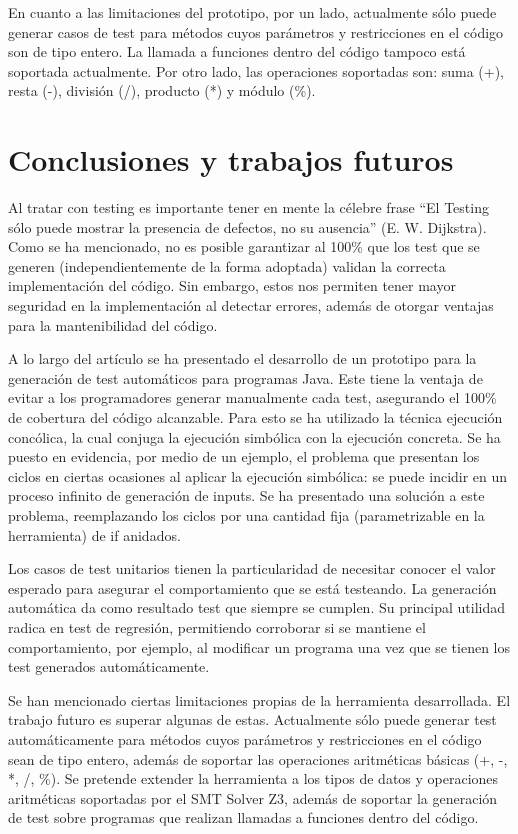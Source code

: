 \documentclass{llncs}
\begin{document}
En cuanto a las limitaciones del prototipo, por un lado, actualmente sólo puede generar casos de test para métodos cuyos parámetros y restricciones en el código son de tipo entero.
La llamada a funciones dentro del código tampoco está soportada actualmente. Por otro lado, las operaciones soportadas son: suma (+), resta (-),
división (/), producto (*) y módulo (\%).

\section{Conclusiones y trabajos futuros}
Al tratar con testing es importante tener en mente la célebre frase “El Testing sólo puede mostrar la presencia de defectos, no su ausencia” (E. W. Dijkstra).
Como se ha mencionado, no es posible garantizar al 100\% que los test que se generen (independientemente de la forma adoptada) validan la correcta
implementación del código. Sin embargo, estos nos permiten tener mayor seguridad en la implementación al detectar errores, además de otorgar ventajas
para la mantenibilidad del código.

A lo largo del artículo se ha presentado el desarrollo de un prototipo para la generación de test automáticos para programas Java. Este tiene la ventaja
de evitar a los programadores generar manualmente cada test, asegurando el 100\% de cobertura del código alcanzable. Para esto se ha utilizado la
técnica ejecución concólica, la cual conjuga la ejecución simbólica con la ejecución concreta. Se ha puesto en evidencia, por medio de un ejemplo,
el problema que presentan los ciclos en ciertas ocasiones al aplicar la ejecución simbólica: se puede incidir en un proceso infinito de generación de inputs.
Se ha presentado una solución a este problema, reemplazando los ciclos por una cantidad fija (parametrizable en la herramienta) de if anidados.


Los casos de test unitarios tienen la particularidad de necesitar conocer el valor esperado para asegurar el comportamiento que se está testeando.
La generación automática da como resultado test que siempre se cumplen. Su principal utilidad radica en test de regresión, permitiendo corroborar
si se mantiene el comportamiento, por ejemplo, al modificar un programa una vez que se tienen los test generados automáticamente.

Se han mencionado ciertas limitaciones propias de la herramienta desarrollada. El trabajo futuro es superar algunas de estas. Actualmente sólo puede
generar test automáticamente para métodos cuyos parámetros y restricciones en el código sean de tipo entero, además de soportar las operaciones
aritméticas básicas (+, -, *, /, \%). Se pretende extender la herramienta a los tipos de datos y operaciones aritméticas soportadas por el SMT Solver Z3,
además de soportar la generación de test sobre programas que realizan llamadas a funciones dentro del código.
\end{document}
